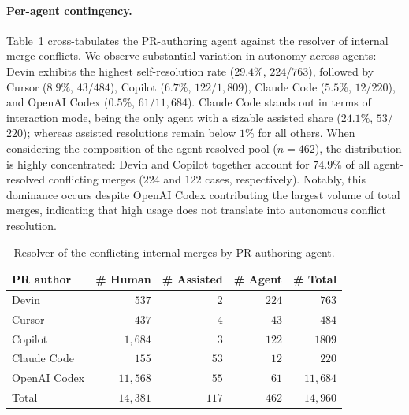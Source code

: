\documentclass[sigconf,anonymous]{acmart}
\begin{document}
\paragraph{Per-agent contingency.} Table~\ref{tab:resolver-by-agent} cross-tabulates the PR-authoring agent against the resolver of  internal merge conflicts. We observe substantial variation in autonomy across agents: Devin exhibits the highest self-resolution rate ($29.4\%$, $224$/$763$), followed by Cursor ($8.9\%$, $43$/$484$), Copilot ($6.7\%$, $122$/$1{,}809$), Claude Code ($5.5\%$, $12$/$220$), and OpenAI Codex ($0.5\%$, $61$/$11{,}684$). Claude Code stands out in terms of interaction mode, being the only agent with a sizable assisted share ($24.1\%$, $53$/$220$); whereas assisted resolutions remain below $1\%$ for all others. When considering the composition of the agent-resolved pool ($n = 462$), the distribution is highly concentrated: Devin and Copilot together  account for $74.9\%$ of all agent-resolved conflicting merges ($224$ and $122$ cases, respectively). Notably, this dominance occurs despite OpenAI Codex contributing the largest volume of total merges, indicating that high usage does not translate into autonomous conflict resolution.

\begin{table}
  \caption{Resolver of the conflicting internal merges by PR-authoring agent.}
  \label{tab:resolver-by-agent}
  \begin{tabular}{lrrrr}
    \toprule
    PR author &  \# Human 
& \# Assisted 
&\# Agent &\# Total\\
    \midrule
    Devin        &  $537$        
& $2$   
&$224$ &$763$\\
    Cursor       &  $437$        
& $4$   
&$43$  &$484$\\
    Copilot      &  $1{,}684$    
& $3$   
&$122$ &$1809$\\
    Claude Code  &  $155$        
& $53$  
&$12$  &$220$\\
    OpenAI Codex &  $11{,}568$   
& $55$  
&$61$  &$11{,}684$\\
    \midrule
    Total        &  $14{,}381$   & $117$ &$462$ &$14{,}960$\\
    \bottomrule
  \end{tabular}
\end{table}
\end{document}
